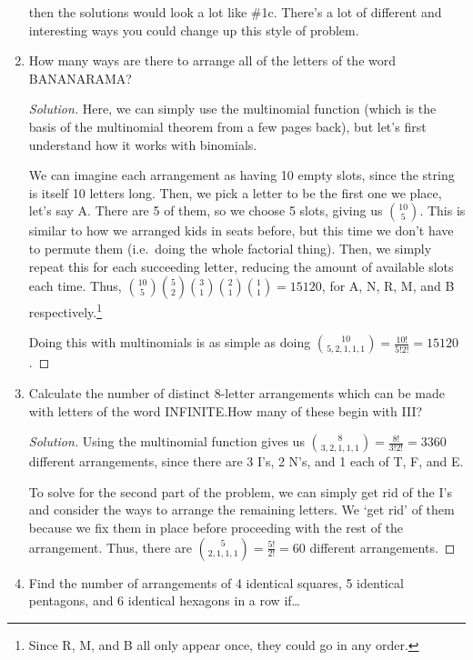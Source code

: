 \documentclass{article}
\newenvironment{solution}
  {\renewcommand\qedsymbol{$\blacksquare$}\begin{proof}[Solution]}
  {\end{proof}}
\begin{document}
\begin{enumerate}
{\begin{minipage}[t]{.76\textwidth}
        then the solutions would look a lot like \#1c. There's a lot of different and interesting ways you could change up this style of problem.  
    \end{minipage}%
    } 
    \item How many ways are there to arrange all of the letters of the word BANANARAMA?\begin{solution} 
        Here, we can simply use the multinomial function (which is the basis of the multinomial theorem from a few pages back), but let's first understand how it works with binomials.\par 
        We can imagine each arrangement as having 10 empty slots, since the string is itself 10 letters long. Then, we pick a letter to be the first one we place, let's say A. There are 5 of them, so we 
        choose 5 slots, giving us $\binom{10}{5}$. This is similar to how we arranged kids in seats before, but this time we don't have to permute them (i.e.\ doing the whole factorial thing). Then, we simply 
        repeat this for each succeeding letter, reducing the amount of available slots each time. Thus, $\binom{10}{5} \binom{5}{2} \binom{3}{1} \binom{2}{1} \binom{1}{1} =15120 $, for A, N, R, M, and B respectively.\footnote{Since R, M, and B all only appear once, they could go in any order.}\par 
        Doing this with multinomials is as simple as doing $\binom{10}{5,2,1,1,1} = \frac{10!}{5!2!} = 15120$. 
    \end{solution} 
    \item Calculate the number of distinct 8-letter arrangements which can be made with letters of the word INFINITE.\@ How many of these begin with III?\begin{solution} 
        Using the multinomial function gives us $\binom{8}{3,2,1,1,1} = \frac{8!}{3!2!} = 3360$ different arrangements, since there are 3 I's, 2 N's, and 1 each of T, F, and E.\par
        To solve for the second part of the problem, we can simply get rid of the I's and consider the ways to arrange the remaining letters. We `get rid' of them because we fix them in place before proceeding with the rest of the arrangement.
        Thus, there are $\binom{5}{2,1,1,1} = \frac{5!}{2!} = 60$ different arrangements. 
    \end{solution} 
    \item Find the number of arrangements of 4 identical squares, 5 identical pentagons, and 6 identical hexagons in a row if\ldots\begin{enumerate} 

\end{enumerate}
\end{enumerate}
\end{document}
